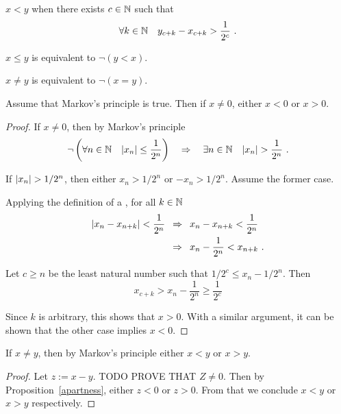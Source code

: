 \documentclass[leqno]{report}
\begin{document}
\begin{Definition}
    $x < y$ when there exists $c \in \mathbb{N}$ such that
    \[ \forall {k \in \mathbb{N}} \quad {y_{c+k} - x_{c+k} > \frac{1}{2^c}} \ . \]

    $x \leq y$ is equivalent to $\neg (y < x)$.

    $x \neq y$ is equivalent to $\neg (x = y)$.
\end{Definition}

\begin{Proposition} \label{apartness}
    Assume that Markov's principle is true. Then if $x \neq 0$, either $x < 0$ or $x > 0$.
\end{Proposition}

\begin{proof}
    If $x \neq 0$, then by Markov's principle
    \[
        \neg \left( \forall {n \in \mathbb{N}} \quad {\left| x_n \right| \leq \frac{1}{2^n}} \right)
        \quad \Rightarrow \quad
        \exists {n \in \mathbb{N}} \quad {\left| x_n \right| > \frac{1}{2^n}} \ .
    \]

    If $\left| x_n \right| > 1/2^n$, then either $x_n > 1/2^n$ or $-x_n > 1/2^n$. Assume the former case.

    Applying the definition of a \FCCS, for all $k \in \mathbb{N}$
    \begin{align*}
        \left| x_n - x_{n+k} \right| < \frac{1}{2^n}
        \enspace&\Rightarrow\enspace x_n - x_{n+k} < \frac{1}{2^n} \\
        \enspace&\Rightarrow\enspace x_n - \frac{1}{2^n} < x_{n+k} \ .
    \end{align*}

    Let $c \geq n$ be the least natural number such that $1/2^c \leq x_n - 1/2^n$. Then
    \[ x_{c+k} > x_n - \frac{1}{2^n} \geq \frac{1}{2^c} \]

    Since $k$ is arbitrary, this shows that $x > 0$. With a similar argument, it can be shown that the other case implies $x < 0$.
\end{proof}

\begin{Corollary}[Apartness]
    If $x \neq y$, then by Markov's principle either $x < y$ or $x > y$.
\end{Corollary}

\begin{proof}
    Let $z := x - y$. TODO PROVE THAT $Z \neq 0$. Then by Proposition~\ref{apartness}, either $z < 0$ or $z > 0$. From that we conclude $x < y$ or $x > y$ respectively.
\end{proof}
\end{document}
